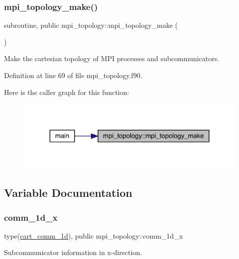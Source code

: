 \subsubsection{\texorpdfstring{mpi\_topology\_make()}{mpi\_topology\_make()}}
{\footnotesize\ttfamily subroutine, public mpi\+\_\+topology\+::mpi\+\_\+topology\+\_\+make (\begin{DoxyParamCaption}{ }\end{DoxyParamCaption})}



Make the cartesian topology of M\+PI processes and subcommunicators. 



Definition at line 69 of file mpi\+\_\+topology.\+f90.

Here is the caller graph for this function\+:
\nopagebreak
\begin{figure}[H]
\begin{center}
\leavevmode
\includegraphics[width=324pt]{namespacempi__topology_a8819f16f50aded913f17520a29d3ec4c_icgraph}
\end{center}
\end{figure}


\subsection{Variable Documentation}
\mbox{\label{namespacempi__topology_a4ef8d80f442649d77707d5ebeeefa391}} 
\subsubsection{\texorpdfstring{comm\_1d\_x}{comm\_1d\_x}}
{\footnotesize\ttfamily type(\mbox{\hyperlink{structmpi__topology_1_1cart__comm__1d}{cart\+\_\+comm\+\_\+1d}}), public mpi\+\_\+topology\+::comm\+\_\+1d\+\_\+x}



Subcommunicator information in x-\/direction. 



